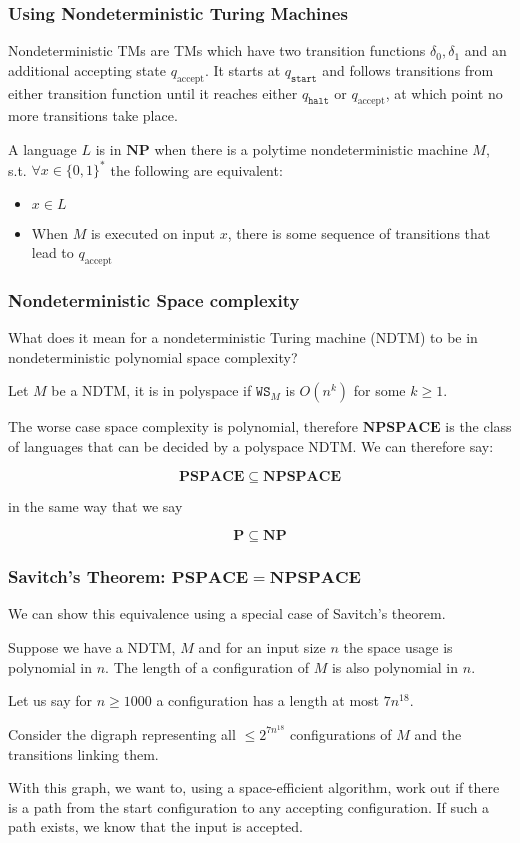\documentclass{beamer}
\newcommand{\qs}{q_{\texttt{start}}}
\newcommand{\qh}{q_{\texttt{halt}}}
\begin{document}
 \begin{frame}[allowframebreaks]
   \frametitle{Using Nondeterministic Turing Machines}
   Nondeterministic TMs are TMs which have two transition functions $\delta_{0}, \delta_{1}$ and an additional accepting state $q_{\text{accept}}$. It starts at $\qs$ and follows transitions from either transition function until it reaches either $\qh$ or $q_{\text{accept}}$, at which point no more transitions take place.
   \framebreak{}
   \begin{definition}
     A language $L$ is in $\mathbf{NP} $ when there is a polytime nondeterministic machine $M$, s.t. $\forall x \in \{ 0,1 \} ^{*}$ the following are equivalent:

     \begin{itemize}
       \item $x \in L$
       \item When $M$ is executed on input $x$, there is some sequence of transitions that lead to $q_{\text{accept}}$
     \end{itemize}
   \end{definition}
 \end{frame}

 \begin{frame}
   \frametitle{Nondeterministic Space complexity}
   What does it mean for a nondeterministic Turing machine (NDTM) to be in nondeterministic polynomial space complexity?

   Let $M$ be a NDTM, it is in polyspace if $\texttt{WS}_{M} $ is $O(n^{k})$ for some $k\geq 1$.

   The worse case space complexity is polynomial, therefore $\mathbf{NPSPACE} $ is the class of languages that can be decided by a polyspace NDTM. We can therefore say:

   \[
     \mathbf{PSPACE} \subseteq \mathbf{NPSPACE}
   \]

   in the same way that we say

   \[
     \mathbf{P} \subseteq \mathbf{NP}
   \]


 \end{frame}

 \begin{frame}
   \frametitle{Savitch's Theorem: $\mathbf{PSPACE} = \mathbf{NPSPACE}  $}

   We can show this equivalence using a special case of Savitch's theorem.

   Suppose we have a NDTM, $M$ and for an input size $n$ the space usage is polynomial in $n$. The length of a configuration of $M$ is also polynomial in $n$.

   Let us say for $n\geq 1000$ a configuration has a length at most $7n^{18}$.

   Consider the digraph representing all $\leq 2^{7n^{18}}$ configurations of $M$ and the transitions linking them.

   With this graph, we want to, using a space-efficient algorithm, work out if there is a path from the start configuration to any accepting configuration. If such a path exists, we know that the input is accepted.
 \end{frame}
\end{document}
